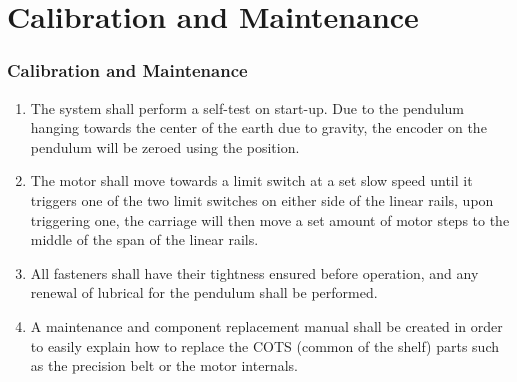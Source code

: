 \documentclass[aspectratio=169]{beamer}
\begin{document}
\section{Calibration and Maintenance}
\begin{frame}
    \frametitle{Calibration and Maintenance}

    \begin{enumerate}
        \item The system shall perform a self-test on start-up. Due to the pendulum hanging towards the center of the earth due to gravity, the encoder on the pendulum will be zeroed using the position.
        \item The motor shall move towards a limit switch at a set slow speed until it triggers one of the two limit switches on either side of the linear rails, upon triggering one, the carriage will then move a set amount of motor steps to the middle of the span of the linear rails.
        \item All fasteners shall have their tightness ensured before operation, and any renewal of lubrical for the pendulum shall be performed.
        \item A maintenance and component replacement manual shall be created in order to easily explain how to replace the COTS (common of the shelf) parts such as the precision belt or the motor internals.
    \end{enumerate}

\end{frame}
\end{document}
